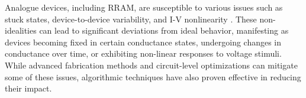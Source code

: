 \noindent Analogue devices, including RRAM, are susceptible to various issues such as stuck states, device-to-device variability, and I-V nonlinearity \cite{mehonic2017intrinsic}. These non-idealities can lead to significant deviations from ideal behavior, manifesting as devices becoming fixed in certain conductance states, undergoing changes in conductance over time, or exhibiting non-linear responses to voltage stimuli. While advanced fabrication methods and circuit-level optimizations can mitigate some of these issues, algorithmic techniques have also proven effective in reducing their impact.\\





